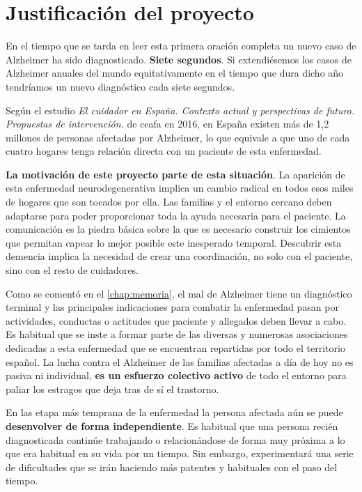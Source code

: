 \section{Justificación del proyecto}
\label{sec:justification}

En el tiempo que se tarda en leer esta primera oración completa un nuevo caso de Alzheimer ha sido diagnosticado. \textbf{Siete segundos}. Si extendiésemos los casos de Alzheimer anuales del mundo equitativamente en el tiempo que dura dicho año tendríamos un nuevo diagnóstico cada siete segundos.

Según el estudio \emph{El cuidador en España. Contexto actual y perspectivas de futuro. Propuestas de intervención.}\cite{ceafa2016cuidador} de \acrshort{ceafa} en 2016, en España existen más de 1,2 millones de personas afectadas por Alzheimer, lo que equivale a que uno de cada cuatro hogares tenga relación directa con un paciente de esta enfermedad.

\textbf{La motivación de este proyecto parte de esta situación}. La aparición de esta enfermedad neurodegenerativa implica un cambio radical en todos esos miles de hogares que son tocados por ella. Las familias y el entorno cercano deben adaptarse para poder proporcionar toda la ayuda necesaria para el paciente. La comunicación es la piedra básica sobre la que es necesario construir los cimientos que permitan capear lo mejor posible este inesperado temporal. Descubrir esta demencia implica la necesidad de crear una coordinación, no solo con el paciente, sino con el resto de cuidadores.

Como se comentó en el \autoref{chap:memoria}, el mal de Alzheimer tiene un diagnóstico terminal y las principales indicaciones para combatir la enfermedad pasan por actividades, conductas o actitudes que paciente y allegados deben llevar a cabo. Es habitual que se inste a formar parte de las diversas y numerosas asociaciones dedicadas a esta enfermedad que se encuentran repartidas por todo el territorio español. La lucha contra el Alzheimer de las familias afectadas a día de hoy no es pasiva ni individual, \textbf{es un esfuerzo colectivo activo} de todo el entorno para paliar los estragos que deja tras de sí el trastorno.

En las etapa más temprana de la enfermedad la persona afectada aún se puede \textbf{desenvolver de forma independiente}. Es habitual que una persona recién diagnosticada continúe trabajando o relacionándose de forma muy próxima a lo que era habitual en su vida por un tiempo. Sin embargo, experimentará una serie de dificultades que se irán haciendo más patentes y habituales con el paso del tiempo.

